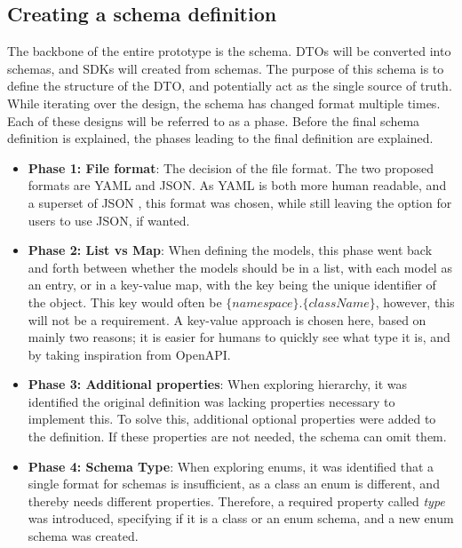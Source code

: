 \subsection{Creating a schema definition \label{sec:design:scema_definiton}}
The backbone of the entire prototype is the schema. 
DTOs will be converted into schemas, and SDKs will created from schemas.
The purpose of this schema is to define the structure of the DTO, and potentially act as the single source of truth.
While iterating over the design, the schema has changed format multiple times. 
Each of these designs will be referred to as a phase. 
Before the final schema definition is explained, the phases leading to the final definition are explained.
\begin{itemize}
    \item \textbf{Phase 1: File format}: The decision of the file format. The two proposed formats are YAML and JSON. As YAML is both more human readable, and a superset of JSON \cite{yaml_definiton}, this format was chosen, while still leaving the option for users to use JSON, if wanted.
    \item \textbf{Phase 2: List vs Map}: When defining the models, this phase went back and forth between whether the models should be in a list, with each model as an entry, or in a key-value map, with the key being the unique identifier of the object. This key would often be \( \{namespace\}.\{className\} \), however, this will not be a requirement. A key-value approach is chosen here, based on mainly two reasons; it is easier for humans to quickly see what type it is, and by taking inspiration from OpenAPI.
    \item \textbf{Phase 3: Additional properties}: When exploring hierarchy, it was identified the original definition was lacking properties necessary to implement this. To solve this, additional optional properties were added to the definition. If these properties are not needed, the schema can omit them.
    \item \textbf{Phase 4: Schema Type}: When exploring enums, it was identified that a single format for schemas is insufficient, as a class an enum is different, and thereby needs different properties. Therefore, a required property called \textit{type} was introduced, specifying if it is a class or an enum schema, and a new enum schema was created.

\end{itemize}
